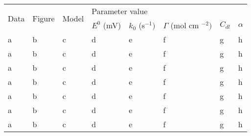 
\begin{table}[]
\begin{tabular}{|l|l|l|lllll|}
\hline
\multirow{2}{*}{Data} & \multirow{2}{*}{Figure} & \multirow{2}{*}{Model} & \multicolumn{5}{l|}{Parameter value}                                                                                                                             \\ \cline{4-8} 
                       &                         &                        & \multicolumn{1}{l|}{$E^0$ (mV)} & \multicolumn{1}{l|}{$k_0$ (s$^{-1})$} & \multicolumn{1}{l|}{$\Gamma$ (mol cm $^{-2})$} & \multicolumn{1}{l|}{$C_{dl}$ } & $\alpha$ \\ \hline
a                     & b                       & c                      & \multicolumn{1}{l|}{d}         & \multicolumn{1}{l|}{e}              & \multicolumn{1}{l|}{f}                       & \multicolumn{1}{l|}{g}          & h        \\ \hline
a                     & b                       & c                      & \multicolumn{1}{l|}{d}         & \multicolumn{1}{l|}{e}              & \multicolumn{1}{l|}{f}                       & \multicolumn{1}{l|}{g}          & h        \\ \hline
a                     & b                       & c                      & \multicolumn{1}{l|}{d}         & \multicolumn{1}{l|}{e}              & \multicolumn{1}{l|}{f}                       & \multicolumn{1}{l|}{g}          & h        \\ \hline
a                     & b                       & c                      & \multicolumn{1}{l|}{d}         & \multicolumn{1}{l|}{e}              & \multicolumn{1}{l|}{f}                       & \multicolumn{1}{l|}{g}          & h        \\ \hline
a                     & b                       & c                      & \multicolumn{1}{l|}{d}         & \multicolumn{1}{l|}{e}              & \multicolumn{1}{l|}{f}                       & \multicolumn{1}{l|}{g}          & h        \\ \hline
a                     & b                       & c                      & \multicolumn{1}{l|}{d}         & \multicolumn{1}{l|}{e}              & \multicolumn{1}{l|}{f}                       & \multicolumn{1}{l|}{g}          & h        \\ \hline
a                     & b                       & c                      & \multicolumn{1}{l|}{d}         & \multicolumn{1}{l|}{e}              & \multicolumn{1}{l|}{f}                       & \multicolumn{1}{l|}{g}          & h        \\ \hline

\end{tabular}
\end{table}

